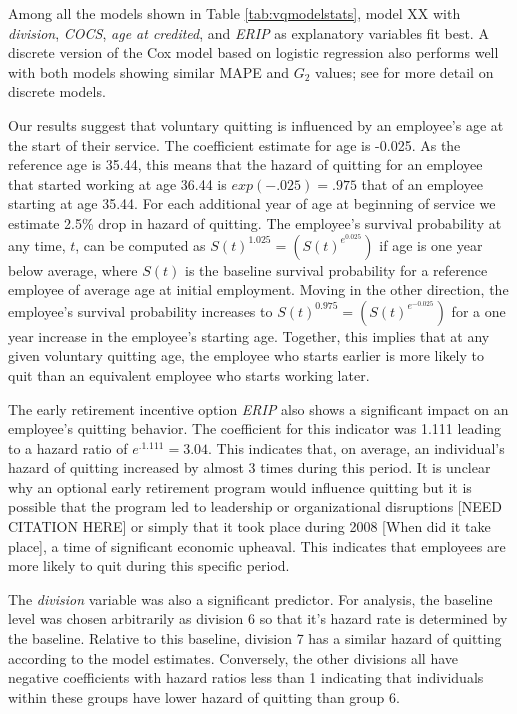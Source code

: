 \documentclass[12pt,letterpaper]{article}
\begin{document}
Among all the models shown in Table \ref{tab:vqmodelstats}, model XX with {\it division}, {\it COCS}, {\it age at credited}, and {\it ERIP} as explanatory variables fit best.  A discrete version of the Cox model based on logistic regression also performs well with both models showing similar MAPE and $G_2$ values; see \citet{allison2010} for more detail on discrete models. 

Our results suggest that voluntary quitting is influenced by an employee's age at the start of their service. The coefficient estimate for age is -0.025. As the reference age is 35.44, this means that the hazard of quitting for an employee that started working at age 36.44 is $exp(-.025)=.975$ that of an employee starting at age 35.44. For each additional year of age at beginning of service we estimate 2.5\% drop in hazard of quitting. The employee's survival probability at any time, $t$, can be computed as $S(t)^{1.025} = (S(t)^{e^{0.025}})$ if age is one year below average, where $S(t)$ is the baseline survival probability for a reference employee of average age at initial employment. Moving in the other direction, the employee's survival probability increases to $S(t)^{0.975}=(S(t)^{e^{-0.025}})$ for a one year increase in the employee's starting age. Together, this implies that at any given voluntary quitting age, the employee who starts earlier is more likely to quit than an equivalent employee who starts working later.

The early retirement incentive option {\it ERIP} also shows a significant impact on an employee's quitting behavior.  The coefficient for this indicator was 1.111 leading to a hazard ratio of $e^{.1.111} = 3.04$.  This indicates that, on average, an individual's hazard of quitting increased by almost 3 times during this period.  It is unclear why an optional early retirement program would influence quitting but it is possible that the program led to leadership or organizational disruptions [NEED CITATION HERE] or simply that it took place during  2008 [When did it take place], a time of significant economic upheaval. This indicates that employees are more likely to quit during this specific period.

The {\it division} variable was also a significant predictor.  For analysis, the baseline level was chosen arbitrarily as division 6 so that it's hazard rate is determined by the baseline.  Relative to this baseline, division 7 has a similar hazard of quitting according to the model estimates. Conversely, the other divisions all have negative coefficients with hazard ratios less than 1 indicating that individuals within these groups have lower hazard of quitting than group 6.
\end{document}

